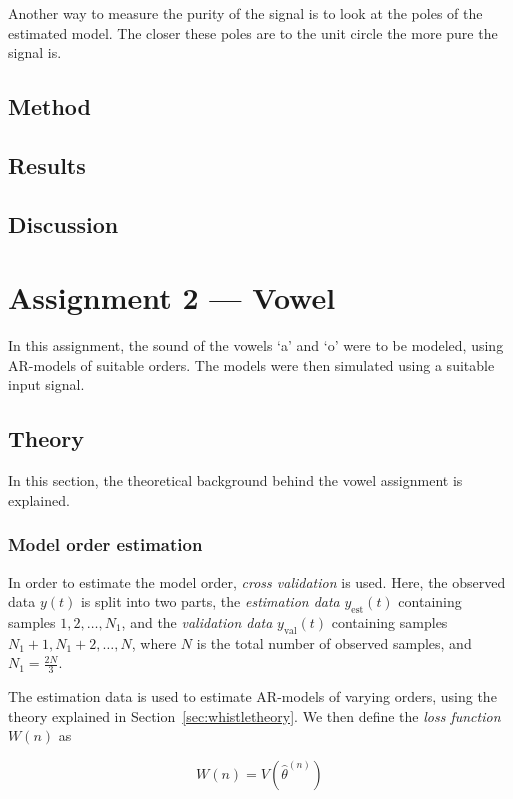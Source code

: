 \documentclass{IEEEtran}
\newcommand{\val}[1]{#1_{\text{val}}}
\newcommand{\est}[1]{#1_{\text{est}}}
\begin{document}
Another way to measure the purity of the signal is to look at the poles
of the estimated model. The closer these poles are to the unit circle
the more pure the signal is.

\subsection{Method}
\subsection{Results}
\subsection{Discussion}

\section{Assignment 2 --- Vowel}

In this assignment, the sound of the vowels `a' and `o' were to be
modeled, using AR-models of suitable orders. The models were then
simulated using a suitable input signal.

\subsection{Theory}

In this section, the theoretical background behind the vowel assignment is
explained.

\subsubsection{Model order estimation}

In order to estimate the model order, \textit{cross validation} is used.
Here, the observed data $y(t)$ is split into two
parts, the \textit{estimation data} $\est{y}(t)$ containing samples $1,
2,\ldots,N_1$, and
the \textit{validation data} $\val{y}(t)$ containing samples $N_1 + 1, N_1 + 2,
\ldots,N$,
where $N$ is the total number of observed
samples, and $N_1 = \frac{2N}{3}$.

The estimation data is used to estimate AR-models of varying orders, using
the theory explained in Section~\ref{sec:whistletheory}. We then define the
\textit{loss function} $W(n)$ as

\begin{equation}
    W(n) = V(\hat{\theta}^{(n)})
\end{equation}
\end{document}
